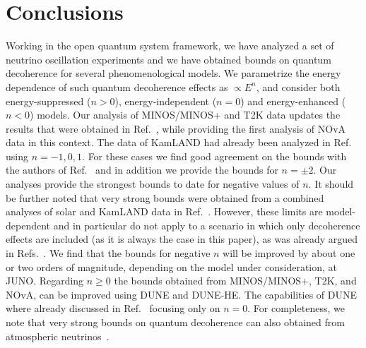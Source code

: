 \documentclass[aps, prd, onecolumn, tightenlines, notitlepage, superscriptaddress, nofootinbib, preprintnumbers, floatfix,showkeys,11pt]{revtex4-2}
\begin{document}
\section{Conclusions}
\label{sec:concl}
Working in the open quantum system framework, we have analyzed a set of neutrino oscillation experiments and we have obtained bounds on quantum decoherence for several phenomenological models.
We parametrize the energy dependence of such quantum decoherence effects as $\propto E^{n}$, and consider both energy-suppressed ($n>0$), energy-independent ($n=0$) and energy-enhanced ($n<0$) models.
Our analysis of MINOS/MINOS+ and T2K data updates the results that were obtained in Ref.~\cite{Gomes:2020muc}, while providing the first analysis of NOvA data in this context. The data of KamLAND had already been analyzed in Ref.~\cite{BalieiroGomes:2016ykp} using $n=-1,0,1$. For these cases we find good agreement on the bounds with the authors of Ref.~\cite{BalieiroGomes:2016ykp} and in addition we provide the bounds for $n=\pm 2$. Our analyses provide the strongest bounds to date for negative values of $n$. It should be further noted that very strong bounds were obtained from a combined analyses of solar and KamLAND data in Ref.~\cite{Fogli:2007tx}. However, these limits are model-dependent and in particular do not apply to a scenario in which only decoherence effects are included (as it is always the case in this paper), as was already argued in Refs.~\cite{BalieiroGomes:2016ykp,Guzzo:2014jbp}. We find that the bounds for negative $n$ will be improved by about one or two orders of magnitude, depending on the model under consideration, at JUNO. Regarding $n\geq0$ the bounds obtained from MINOS/MINOS+, T2K, and NOvA, can be improved using DUNE and DUNE-HE. The capabilities of DUNE where already discussed in Ref.~\cite{BalieiroGomes:2018gtd} focusing only on $n=0$. For completeness, we note that very strong bounds on quantum decoherence can also obtained from atmospheric neutrinos~\cite{Coloma:2018idr}.
\end{document}
